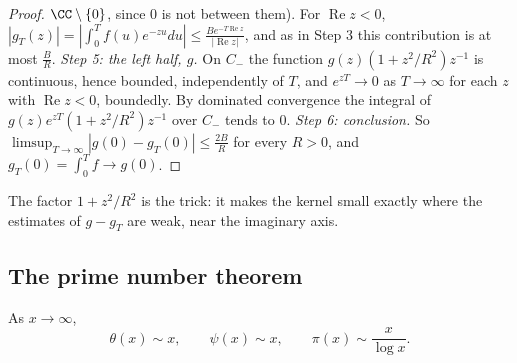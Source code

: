 \begin{proof}
$\CC \setminus \{0\}$, since $0$ is not between them). For $\operatorname{Re}z < 0$, $|g_T(z)| = |\int_0^Tf(u)e^{-zu}du| \leq \frac{Be^{-T\operatorname{Re}z}}{|\operatorname{Re}z|}$, and as in Step 3
this contribution is at most $\frac{B}{R}$.
\emph{Step 5: the left half, $g$.} On $C_-$ the function $g(z)(1 + z^2/R^2)z^{-1}$ is continuous, hence bounded, independently of $T$, and $e^{zT} \to 0$ as $T \to \infty$ for each $z$ with
$\operatorname{Re}z < 0$, boundedly. By dominated convergence the integral of $g(z)e^{zT}(1 + z^2/R^2)z^{-1}$ over $C_-$ tends to $0$.
\emph{Step 6: conclusion.} So $\limsup_{T \to \infty}|g(0) - g_T(0)| \leq \frac{2B}{R}$ for every $R > 0$, and $g_T(0) = \int_0^Tf \to g(0)$.
\end{proof}

The factor $1 + z^2/R^2$ is the trick: it makes the kernel small exactly where the estimates of $g - g_T$ are weak, near the imaginary axis.

\subsection{The prime number theorem}\label{analytic-number-theory:subsection-pnt}

\begin{theorem}\label{analytic-number-theory:theorem-pnt}
As $x \to \infty$,
\[
\theta(x) \sim x, \qquad \psi(x) \sim x, \qquad \pi(x) \sim \frac{x}{\log x}.
\]
\end{theorem}

